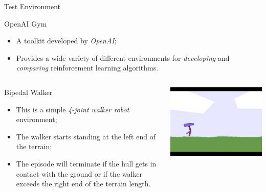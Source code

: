 \documentclass[presentation]{beamer}\mode<presentation>{\usetheme{AMSBolognaFC}}
\begin{document}
\begin{frame}{Test Environment}

\begin{block}{OpenAI Gym}
	\begin{itemize}
		\item A toolkit developed by \emph{OpenAI};
		\item Provides a wide variety of different environments for \emph{developing} and \emph{comparing} 
			reinforcement learning algorithms.
	\end{itemize}
\end{block}

\begin{columns}
	\begin{column}{0.55\textwidth}
		\begin{alertblock}{Bipedal Walker}
			\begin{itemize}
				\item This is a simple \emph{4-joint walker robot} environment;
				\item The walker starts standing at the left end of the terrain;
				\item The episode will terminate if the hull gets in contact with the 
					ground or if the walker exceeds the right end of the terrain length.
			\end{itemize}
		\end{alertblock}
	\end{column}
	\begin{column}{0.45\textwidth}
	\includegraphics[width=\textwidth]{img/bipedal.jpeg}
	\end{column}
\end{columns}

\end{frame}
\end{document}

